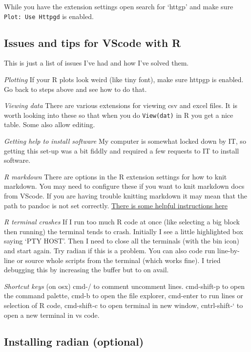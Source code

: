 \documentclass[
  letterpaper,
  DIV=11,
  numbers=noendperiod]{scrreprt}
\begin{document}
While you have the extension settings open search for `httgp' and make
sure \texttt{Plot:\ Use\ Httpgd} is enabled.

\subsection{Issues and tips for VScode with
R}\label{issues-and-tips-for-vscode-with-r}

This is just a list of issues I've had and how I've solved them.

\emph{Plotting} If your R plots look weird (like tiny font), make sure
httpgp is enabled. Go back to steps above and see how to do that.

\emph{Viewing data} There are various extensions for viewing csv and
excel files. It is worth looking into these so that when you do
\texttt{View(dat)} in R you get a nice table. Some also allow editing.

\emph{Getting help to install software} My computer is somewhat locked
down by IT, so getting this set-up was a bit fiddly and required a few
requests to IT to install software.

\emph{R markdown} There are options in the R extension settings for how
to knit markdown. You may need to configure these if you want to knit
markdown docs from VScode. If you are having trouble knitting markdown
it may mean that the path to pandoc is not set correctly.
\href{https://stackoverflow.com/questions/60766646/need-help-assigning-global-settings-for-rstudios-pandoc-in-vscode-to-knit-pdf-d}{There
is some helpful instructions here}

\emph{R terminal crashes} If I run too much R code at once (like
selecting a big block then running) the terminal tends to crash.
Initially I see a little highlighted box saying `PTY HOST'. Then I need
to close all the terminals (with the bin icon) and start again. Try
radian if this is a problem. You can also code run line-by-line or
source whole scripts from the terminal (which works fine). I tried
debugging this by increasing the buffer but to on avail.

\emph{Shortcut keys} (on osx) cmd-/ to comment uncomment lines.
cmd-shift-p to open the command palette, cmd-b to open the file
explorer, cmd-enter to run lines or selection of R code, cmd-shift-c to
open terminal in new window, cntrl-shift-` to open a new terminal in vs
code.

\subsection{Installing radian
(optional)}\label{installing-radian-optional}
\end{document}
